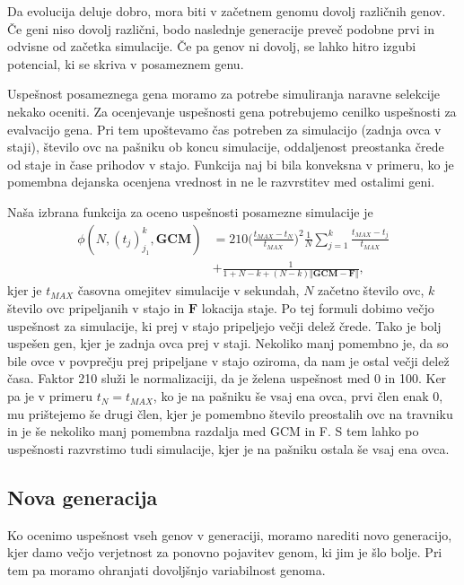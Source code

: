 Da evolucija deluje dobro, mora biti v začetnem genomu dovolj različnih genov. Če geni niso dovolj različni, bodo naslednje generacije preveč podobne prvi in odvisne od začetka simulacije. Če pa genov ni dovolj, se lahko hitro izgubi potencial, ki se skriva v posameznem genu.

Uspešnost posameznega gena moramo za potrebe simuliranja naravne selekcije nekako oceniti. Za ocenjevanje uspešnosti gena potrebujemo cenilko uspešnosti za evalvacijo gena. Pri tem upoštevamo čas potreben za simulacijo (zadnja ovca v staji), število ovc na pašniku ob koncu simulacije, oddaljenost preostanka črede od staje in čase prihodov v stajo. Funkcija naj bi bila konveksna v primeru, ko je pomembna dejanska ocenjena vrednost in ne le razvrstitev med ostalimi geni.

Naša izbrana funkcija za oceno uspešnosti posamezne simulacije je
\begin{align}
\phi(N, (t_j)_{j_1}^k, \mathbf{GCM}) &= 210\Big(\frac{t_{MAX} - t_N}{t_{MAX}}\Big)^2\frac{1}{N}\sum_{j=1}^k \frac{t_{MAX} - t_j}{t_{MAX}} \label{eq:genetski} \\
 &+ \frac{1}{1 + N - k + (N - k)\Vert \mathbf{GCM} - \mathbf{F}\Vert}, \nonumber
\end{align}
kjer je $t_{MAX}$ časovna omejitev simulacije v sekundah, $N$ začetno število ovc, $k$ število ovc pripeljanih v stajo in $\mathbf{F}$ lokacija staje. Po tej formuli dobimo večjo uspešnost za simulacije, ki prej v stajo pripeljejo večji delež črede. Tako je bolj uspešen gen, kjer je zadnja ovca prej v staji. Nekoliko manj pomembno je, da so bile ovce v povprečju prej pripeljane v stajo oziroma, da nam je ostal večji delež časa. Faktor 210 služi le normalizaciji, da je želena uspešnost med 0 in 100. Ker pa je v primeru $t_N = t_{MAX}$, ko je na pašniku še vsaj ena ovca, prvi člen enak 0, mu prištejemo še drugi člen, kjer je pomembno število preostalih ovc na travniku in je še nekoliko manj pomembna razdalja med GCM in F. S tem lahko po uspešnosti razvrstimo tudi simulacije, kjer je na pašniku ostala še vsaj ena ovca.

\subsection{Nova generacija}

Ko ocenimo uspešnost vseh genov v generaciji, moramo narediti novo generacijo, kjer damo večjo verjetnost za ponovno pojavitev genom, ki jim je šlo bolje. Pri tem pa moramo ohranjati dovoljšnjo variabilnost genoma.

